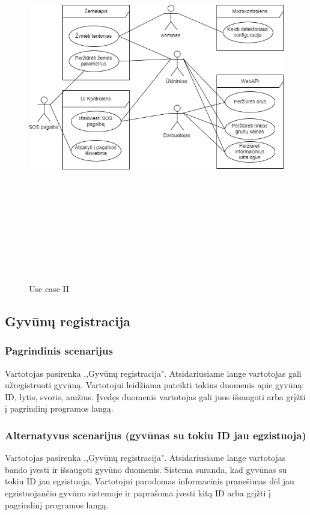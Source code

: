 \documentclass[oneside]{VUMIFPSkursinis}
\begin{document}
\begin{itemize}
\begin{figure}[H]
	\includegraphics[width=15cm,height=17cm,keepaspectratio]{UseCase2.png}
	\caption{Use case II}
	\label{fig:UseCaseFull}
\end{figure}
\end{itemize}

\subsection{Gyvūnų registracija}
	\subsubsection{Pagrindinis scenarijus}
	Vartotojas pasirenka ,,Gyvūnų registracija". Atsidariusiame lange vartotojas gali užregistruoti gyvūną. Vartotojui leidžiama pateikti tokius duomenis apie gyvūną: ID, lytis, svoris, amžius. Įvedęs duomenis vartotojas gali juos išsaugoti arba grįžti į pagrindinį programos langą.
	\subsubsection{Alternatyvus scenarijus (gyvūnas su tokiu ID jau egzistuoja)}
	Vartotojas pasirenka ,,Gyvūnų registracija". Atsidariusiame lange vartotojas bando įvesti ir išsaugoti gyvūno duomenis. Sistema suranda, kad gyvūnas su tokiu ID jau egzistuoja. Vartotojui parodomas informacinis pranešimas dėl jau egzistuojančio gyvūno sistemoje ir paprašoma įvesti kitą ID arba grįžti į pagrindinį programos langą. 
\end{document}

